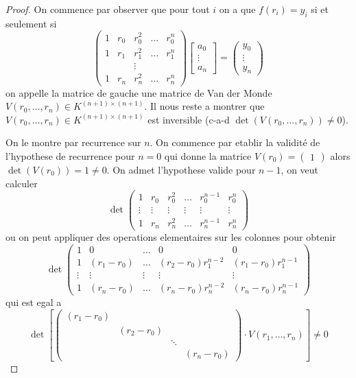 \begin{proof}
On commence par observer que pour tout $i$ on a que $f(r_{i})=y_{i}$ si et seulement si 
$$
\begin{pmatrix}
1 & r_{0} & r_{0}^{2} & \dots & r_{0}^{n} \\
1 & r_{1} & r_{1}^{2} & \dots & r_{1}^{n} \\
 &  & \vdots &  &  \\
1 & r_{n} & r_{n}^{2} & \dots & r_{n}^{n}
\end{pmatrix}
\begin{bmatrix}
a_{0} \\
\vdots \\
a_{n}
\end{bmatrix}=\begin{pmatrix}
y_{0} \\
\vdots \\
y_{n}
\end{pmatrix}
$$
on appelle la matrice de gauche une matrice de Van der Monde $V(r_{0},\dots,r_{n})\in K^{(n+1)\times(n+1)}$. Il nous reste a montrer que $V(r_{0},\dots,r_{n})\in K^{(n+1)\times (n+1)}$ est inversible (c-a-d $\det(V(r_{0},\dots,r_{n}))\neq 0$). 

On le montre par recurrence sur $n$. On commence par etablir la validité de l'hypothese de recurrence pour $n=0$ qui donne la matrice $V(r_{0})=\begin{pmatrix}1\end{pmatrix}$ alors $\det(V(r_{0}))=1\neq 0$. On admet l'hypothese valide pour $n-1$, on veut calculer
$$
\det \begin{pmatrix}
1 & r_{0} & r_{0}^{2} & \dots & r_{0}^{n-1} & r_{0}^{n} \\
\vdots & \vdots & \vdots & \vdots & \vdots & \vdots  \\
1 & r_{n} & r^{2}_{n} & \dots & r_{n}^{n-1} & r_{n}^{n}
\end{pmatrix}
$$
ou on peut appliquer des operations elementaires sur les colonnes pour obtenir
$$
\det \begin{pmatrix}
1 & 0 & \dots & 0 & 0 \\
1 & (r_{1}-r_{0}) & \dots & (r_{2}-r_{0})r_{1}^{n-2} & (r_{1}-r_{0})r_{1}^{n-1} \\
\vdots &\vdots  &  \vdots &\vdots  &\vdots  \\
1 & (r_{n}-r_{0}) & \dots & (r_{n}-r_{0})r_{n}^{n-2} & (r_{n}-r_{0})r^{n-1}_{n}
\end{pmatrix}
$$
qui est egal a
$$
\det \left[\begin{pmatrix}
(r_{1}-r_{0}) &   &   &  \\
 & (r_2-r_{0})    & &  \\
 & &  \ddots \\

 &  &   &  (r_{n}-r_{0})
\end{pmatrix}\cdot V(r_{1},\dots,r_{n})\right]\neq 0
$$
\end{proof}
